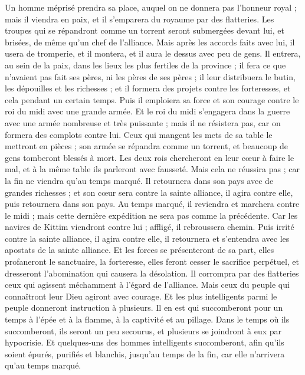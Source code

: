 \begin{multicols}{2}
Un homme méprisé prendra sa place, auquel on ne donnera pas l'honneur royal ; mais il viendra en paix, et il s’emparera du royaume par des flatteries.
Les troupes qui se répandront comme un torrent seront submergées devant lui, et brisées, de même qu’un chef de l’alliance.
Mais après les accords faits avec lui, il usera de tromperie, et il montera, et il aura le dessus avec peu de gens.
Il entrera, au sein de la paix, dans les lieux les plus fertiles de la province ; il fera ce que n’avaient pas fait ses pères, ni les pères de ses pères ; il leur distribuera le butin, les dépouilles et les richesses ; et il formera des projets contre les forteresses, et cela pendant un certain temps.
Puis il emploiera sa force et son courage contre le roi du midi avec une grande armée. Et le roi du midi s’engagera dans la guerre avec une armée nombreuse et très puissante ; mais il ne résistera pas, car on formera des complots contre lui.
Ceux qui mangent les mets de sa table le mettront en pièces ; son armée se répandra comme un torrent, et beaucoup de gens tomberont blessés à mort.
Les deux rois chercheront en leur cœur à faire le mal, et à la même table ils parleront avec fausseté. Mais cela ne réussira pas ; car la fin ne viendra qu’au temps marqué.
Il retournera dans son pays avec de grandes richesses ; et son cœur sera contre la sainte alliance, il agira contre elle, puis retournera dans son pays.
Au temps marqué, il reviendra et marchera contre le midi ; mais cette dernière expédition ne sera pas comme la précédente.
Car les navires de Kittim viendront contre lui ; affligé, il rebroussera chemin. Puis irrité contre la sainte alliance, il agira contre elle, il retournera et s'entendra avec les apostats de la sainte alliance.
Et les forces se présenteront de sa part, elles profaneront le sanctuaire, la forteresse, elles feront cesser le sacrifice perpétuel, et dresseront l'abomination qui causera la désolation.
Il corrompra par des flatteries ceux qui agissent méchamment à l’égard de l'alliance. Mais ceux du peuple qui connaîtront leur Dieu agiront avec courage.
Et les plus intelligents parmi le peuple donneront instruction à plusieurs. Il en est qui succomberont pour un temps à l'épée et à la flamme, à la captivité et au pillage.
Dans le temps où ils  succomberont, ils seront un peu secourus, et plusieurs se joindront à eux par hypocrisie.
Et quelques-uns des hommes intelligents succomberont, afin qu’ils soient épurés, purifiés et blanchis, jusqu'au temps de la fin, car elle n’arrivera qu’au temps marqué.

\end{multicols}
